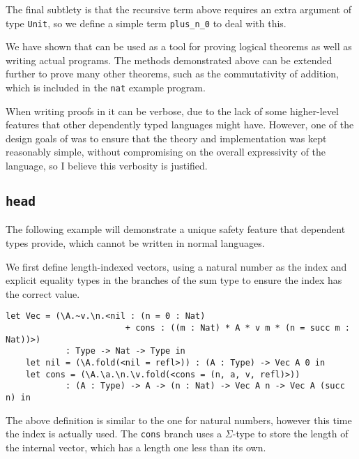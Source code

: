 \documentclass[12pt,a4paper,twoside]{report}
\begin{document}
The final subtlety is that the recursive term above requires an extra argument of type \lstinline{Unit}, so we define a simple term \lstinline{plus_n_0} to deal with this.

We have shown that \pimu{} can be used as a tool for proving logical theorems as well as writing actual programs.
The methods demonstrated above can be extended further to prove many other theorems, such as the commutativity of addition, which is included in the \texttt{nat} example program.

When writing proofs in \pimu{} it can be verbose, due to the lack of some higher-level features that other dependently typed languages might have.
However, one of the design goals of \pimu{} was to ensure that the theory and implementation was kept reasonably simple, without compromising on the overall expressivity of the language, so I believe this verbosity is justified.

\subsection{\texttt{head}}

The following example will demonstrate a unique safety feature that dependent types provide, which cannot be written in normal languages.

We first define length-indexed vectors, using a natural number as the index and explicit equality types in the branches of the sum type to ensure the index has the correct value.
\begin{minipage}{\linewidth}
\begin{lstlisting}[gobble=4]
    let Vec = (\A.~v.\n.<nil : (n = 0 : Nat)
                        + cons : ((m : Nat) * A * v m * (n = succ m : Nat))>)
            : Type -> Nat -> Type in
    let nil = (\A.fold(<nil = refl>)) : (A : Type) -> Vec A 0 in
    let cons = (\A.\a.\n.\v.fold(<cons = (n, a, v, refl)>))
            : (A : Type) -> A -> (n : Nat) -> Vec A n -> Vec A (succ n) in
\end{lstlisting}
\end{minipage}
The above definition is similar to the one for natural numbers, however this time the index is actually used.
The \lstinline{cons} branch uses a \(\Sigma\)-type to store the length of the internal vector, which has a length one less than its own.
\end{document}
